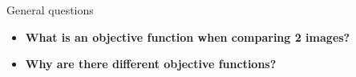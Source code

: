 \documentclass{beamer}
\begin{document}
\begin{frame}{General questions}
  \begin{itemize}
    \item \textbf{What is an objective function when comparing 2 images?}


    \bigskip
    \item \textbf{Why are there different objective functions?}

  \end{itemize}
\end{frame}

% 
% 
% 
\end{document}
